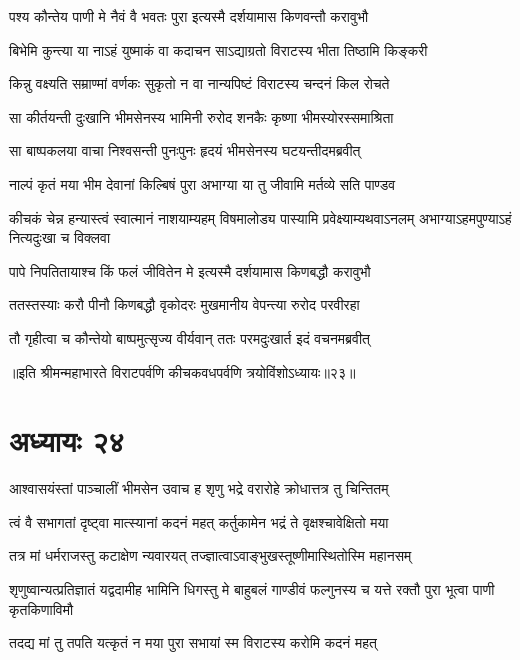 \twolineshloka
{पश्य कौन्तेय पाणी मे नैवं वै भवतः पुरा}
{इत्यस्मै दर्शयामास किणवन्तौ करावुभौ}


\twolineshloka
{बिभेमि कुन्त्या या नाऽहं युष्माकं वा कदाचन}
{साऽद्याग्रतो विराटस्य भीता तिष्ठामि किङ्करी}


\twolineshloka
{किन्नु वक्ष्यति सम्राण्मां वर्णकः सुकृतो न वा}
{नान्यपिष्टं विराटस्य चन्दनं किल रोचते}



\twolineshloka
{सा कीर्तयन्ती दुःखानि भीमसेनस्य भामिनी}
{रुरोद शनकैः कृष्णा भीमस्योरस्समाश्रिता}


\twolineshloka
{सा बाष्पकलया वाचा निश्वसन्ती पुनःपुनः}
{हृदयं भीमसेनस्य घटयन्तीदमब्रवीत्}


\twolineshloka
{नाल्पं कृतं मया भीम देवानां किल्बिषं पुरा}
{अभाग्या या तु जीवामि मर्तव्ये सति पाण्डव}


\threelineshloka
{कीचकं चेन्न हन्यास्त्वं स्वात्मानं नाशयाम्यहम्}
{विषमालोड्य पास्यामि प्रवेक्ष्याम्यथवाऽनलम्}
{अभाग्याऽहमपुण्याऽहं नित्यदुःखा च विक्लवा}


\twolineshloka
{पापे निपतितायाश्च किं फलं जीवितेन मे}
{इत्यस्मै दर्शयामास किणबद्धौ करावुभौ}


\twolineshloka
{ततस्तस्याः करौ पीनौ किणबद्धौ वृकोदरः}
{मुखमानीय वेपन्त्या रुरोद परवीरहा}


\twolineshloka
{तौ गृहीत्वा च कौन्तेयो बाष्पमुत्सृज्य वीर्यवान्}
{ततः परमदुःखार्त इदं वचनमब्रवीत्}

॥इति श्रीमन्महाभारते विराटपर्वणि कीचकवधपर्वणि त्रयोविंशोऽध्यायः॥२३॥

\chapter{अध्यायः २४}

\twolineshloka
{आश्वासयंस्तां पाञ्चालीं भीमसेन उवाच ह}
{शृणु भद्रे वरारोहे क्रोधात्तत्र तु चिन्तितम्}


\twolineshloka
{त्वं वै सभागतां दृष्ट्वा मात्स्यानां कदनं महत्}
{कर्तुकामेन भद्रं ते वृक्षश्चावेक्षितो मया}


\twolineshloka
{तत्र मां धर्मराजस्तु कटाक्षेण न्यवारयत्}
{तज्ज्ञात्वाऽवाङ्भुखस्तूष्णीमास्थितोस्मि महानसम्}


\threelineshloka
{शृणुष्वान्यत्प्रतिज्ञातं यद्वदामीह भामिनि}
{धिगस्तु मे बाहुबलं गाण्डीवं फल्गुनस्य च}
{यत्ते रक्तौ पुरा भूत्वा पाणी कृतकिणाविमौ}


\twolineshloka
{तदद्य मां तु तपति यत्कृतं न मया पुरा}
{सभायां स्म विराटस्य करोमि कदनं महत्}


